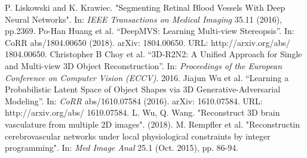 \documentclass[conference, 10pt]{IEEEtran}
\begin{document}
\begin{thebibliography}{00}
 P. Liskowski and K. Krawiec. "Segmenting Retinal Blood Vessels With Deep Neural Networks". In: \textit{IEEE Transactions on Medical Imaging} 35.11 (2016), pp.2369.
 Po-Han Huang et al. “DeepMVS: Learning Multi-view Stereopsis”. In: CoRR abs/1804.00650 (2018). arXiv: 1804.00650. URL: http://arxiv.org/abs/ 1804.00650.
 Christopher B Choy et al. “3D-R2N2: A Unified Approach for Single and Multi-view 3D Object Reconstruction”. In: \textit{Proceedings of the European Conference on Computer Vision (ECCV)}. 2016.
 Jiajun Wu et al. “Learning a Probabilistic Latent Space of Object Shapes via 3D Generative-Adversarial Modeling”. In: \textit{CoRR} abs/1610.07584 (2016). arXiv: 1610.07584. URL: http://arxiv.org/abs/ 1610.07584.
 L. Wu, Q. Wang. "Reconstruct 3D brain vasculature from multiple 2D images". (2018).
 M. Rempfler et al. "Reconstructin cerebrovascular networks under local physiological constraints by integer programming". In: \textit{Med Image Anal} 25.1 (Oct. 2015), pp. 86-94.
\end{thebibliography}
\vspace{12pt}
\end{document}
